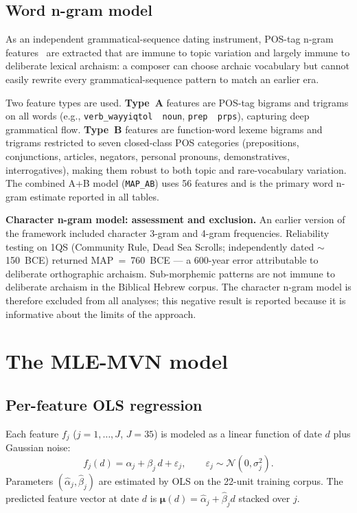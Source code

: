\documentclass[10pt,letterpaper]{article}
\newcommand{\muvec}{\boldsymbol{\mu}}
\begin{document}
\subsection*{Word n-gram model}

As an independent grammatical-sequence dating instrument, POS-tag n-gram
features~\cite{Manning1999,Jurafsky2023} are extracted that are immune to
topic variation and largely immune to deliberate lexical archaism: a composer can choose archaic
vocabulary but cannot easily rewrite every grammatical-sequence pattern
to match an earlier era.

Two feature types are used.  \textbf{Type~A} features are POS-tag bigrams
and trigrams on all words (e.g., \texttt{verb\_wayyiqtol\,\textperiodcentered\,noun},
\texttt{prep\,\textperiodcentered\,prps}), capturing deep grammatical flow.
\textbf{Type~B} features are function-word lexeme bigrams and trigrams
restricted to seven closed-class POS categories (prepositions, conjunctions,
articles, negators, personal pronouns, demonstratives, interrogatives),
making them robust to both topic and rare-vocabulary variation.  The combined
A+B model (\texttt{MAP\_AB}) uses 56 features and is the primary word n-gram
estimate reported in all tables.

\textbf{Character n-gram model: assessment and exclusion.}  An earlier
version of the framework included character 3-gram and 4-gram frequencies.
Reliability testing on 1QS (Community Rule, Dead Sea Scrolls;
independently dated $\sim$150~BCE) returned MAP~=~760~BCE --- a 600-year
error attributable to deliberate orthographic archaism.  Sub-morphemic
patterns are not immune to deliberate archaism in the Biblical Hebrew
corpus.  The character n-gram model is therefore excluded from all
analyses; this negative result is reported because it is informative about
the limits of the approach.

\section*{The MLE-MVN model}

\subsection*{Per-feature OLS regression}

Each feature $f_j$ ($j = 1, \ldots, J$, $J = 35$) is modeled as a linear
function of date $d$ plus Gaussian noise:
%
\begin{equation}
  f_j(d) = \alpha_j + \beta_j \, d + \varepsilon_j, \qquad
  \varepsilon_j \sim \mathcal{N}(0, \sigma_j^2).
  \label{eq:ols}
\end{equation}
%
Parameters $(\hat{\alpha}_j, \hat{\beta}_j)$ are estimated by OLS on the
22-unit training corpus.  The predicted feature vector at date $d$ is
$\muvec(d) = \hat{\alpha}_j + \hat{\beta}_j d$ stacked over $j$.
\end{document}
